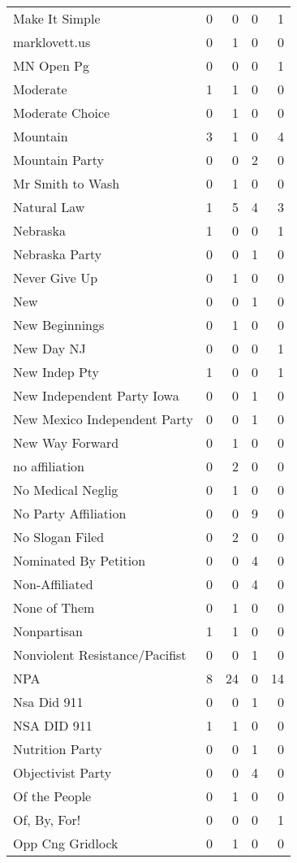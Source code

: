 \begin{supertabular}{lrrrr}
Make It Simple & 0 & 0 & 0 & 1\\
marklovett.us & 0 & 1 & 0 & 0\\
MN Open Pg & 0 & 0 & 0 & 1\\
Moderate & 1 & 1 & 0 & 0\\
Moderate Choice & 0 & 1 & 0 & 0\\
Mountain & 3 & 1 & 0 & 4\\
Mountain Party & 0 & 0 & 2 & 0\\
Mr Smith to Wash & 0 & 1 & 0 & 0\\
Natural Law & 1 & 5 & 4 & 3\\
Nebraska & 1 & 0 & 0 & 1\\
Nebraska Party & 0 & 0 & 1 & 0\\
Never Give Up & 0 & 1 & 0 & 0\\
New & 0 & 0 & 1 & 0\\
New Beginnings & 0 & 1 & 0 & 0\\
New Day NJ & 0 & 0 & 0 & 1\\
New Indep Pty & 1 & 0 & 0 & 1\\
New Independent Party Iowa & 0 & 0 & 1 & 0\\
New Mexico Independent Party & 0 & 0 & 1 & 0\\
New Way Forward & 0 & 1 & 0 & 0\\
no  affiliation & 0 & 2 & 0 & 0\\
No Medical Neglig & 0 & 1 & 0 & 0\\
No Party Affiliation & 0 & 0 & 9 & 0\\
No Slogan Filed & 0 & 2 & 0 & 0\\
Nominated By Petition & 0 & 0 & 4 & 0\\
Non-Affiliated & 0 & 0 & 4 & 0\\
None of Them & 0 & 1 & 0 & 0\\
Nonpartisan & 1 & 1 & 0 & 0\\
Nonviolent Resistance/Pacifist & 0 & 0 & 1 & 0\\
NPA & 8 & 24 & 0 & 14\\
Nsa Did 911 & 0 & 0 & 1 & 0\\
NSA DID 911 & 1 & 1 & 0 & 0\\
Nutrition Party & 0 & 0 & 1 & 0\\
Objectivist Party & 0 & 0 & 4 & 0\\
Of the People & 0 & 1 & 0 & 0\\
Of, By, For! & 0 & 0 & 0 & 1\\
Opp Cng Gridlock & 0 & 1 & 0 & 0\\

\end{supertabular}
